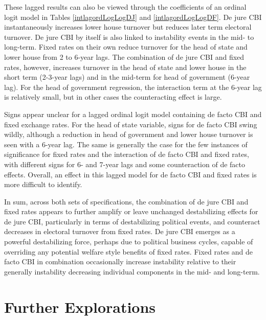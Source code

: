 \documentclass{article}
\begin{document}
    
    
    

    These lagged results can also be viewed through the coefficients of an ordinal logit model in Tables \ref*{intlagordLogLogDJ} and \ref*{intlagordLogLogDF}. De jure CBI instantaneously increases lower house turnover but reduces later term electoral turnover. De jure CBI by itself is also linked to instability events in the mid- to long-term. Fixed rates on their own reduce turnover for the head of state and lower house from 2 to 6-year lags. The combination of de jure CBI and fixed rates, however, increases turnover in the head of state and lower house in the short term (2-3-year lags) and in the mid-term for head of government (6-year lag). For the head of government regression, the interaction term at the 6-year lag is relatively small, but in other cases the counteracting effect is large.
    
    Signs appear unclear for a lagged ordinal logit model containing de facto CBI and fixed exchange rates. For the head of state variable, signs for de facto CBI swing wildly, although a reduction in head of government and lower house turnover is seen with a 6-year lag. The same is generally the case for the few instances of significance for fixed rates and the interaction of de facto CBI and fixed rates, with different signs for 6- and 7-year lags and some counteraction of de facto effects. Overall, an effect in this lagged model for de facto CBI and fixed rates is more difficult to identify.

    

    

    In sum, across both sets of specifications, the combination of de jure CBI and fixed rates appears to further amplify or leave unchanged destabilizing effects for de jure CBI, particularly in terms of destabilizing political events, and counteract decreases in electoral turnover from fixed rates. De jure CBI emerges as a powerful destabilizing force, perhaps due to political business cycles, capable of overriding any potential welfare style benefits of fixed rates. Fixed rates and de facto CBI in combination occasionally increase instability relative to their generally instability decreasing individual components in the mid- and long-term. 

    \section*{Further Explorations}
\end{document}
